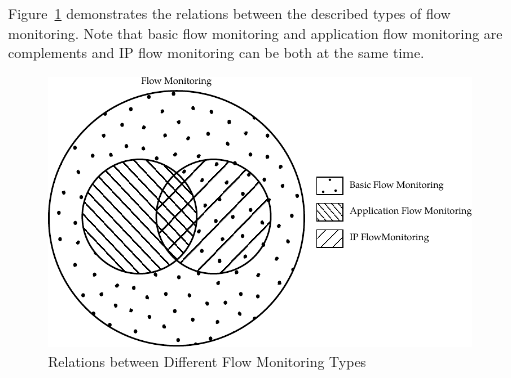 Figure~\ref{fig:flow-monitoring-types} demonstrates the relations between the described types of flow monitoring. Note that basic flow monitoring and application flow monitoring are complements and IP flow monitoring can be both at the same time.

\begin{figure}[t!]
  \begin{center}
    \includegraphics{figures/flow-monitoring-types}
  \end{center}
  \caption{Relations between Different Flow Monitoring Types}
  \label{fig:flow-monitoring-types}
\end{figure}


